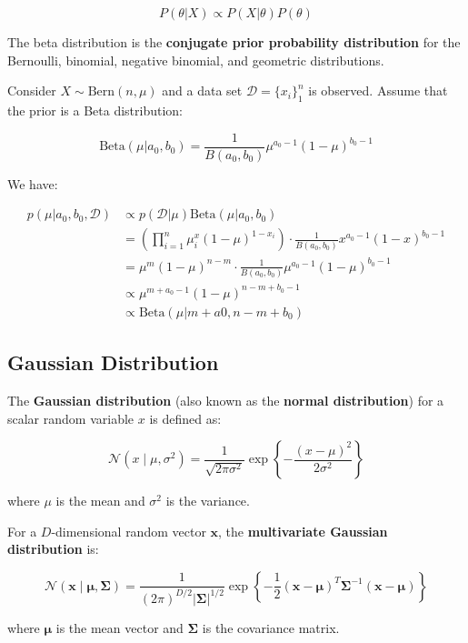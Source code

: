 \[
    P(\theta | X) \propto P(X|\theta)P(\theta)
\]

The beta distribution is the \textbf{conjugate prior probability distribution} for the Bernoulli, binomial, negative binomial, and geometric distributions.

Consider $X \sim \text{Bern}(n, \mu)$ and a data set $\mathcal{D} = \{ x_i \}_1^n$ is observed.
Assume that the prior is a Beta distribution:

\[
    \text{Beta}(\mu | a_0, b_0) = \frac{1}{B(a_0, b_0)} \mu^{a_0 - 1}(1 - \mu)^{b_0 - 1}
\]

We have:

\[
    \begin{align*}
        p(\mu | a_0, b_0, \mathcal{D})
        &\propto p(\mathcal{D} | \mu)\text{Beta}(\mu | a_0, b_0) \\
        &= \left( \prod_{i = 1}^{n}{ \mu_i^x(1-\mu)^{1-x_i} } \right) \cdot \frac{1}{B(a_0, b_0)} x^{a_0 - 1}(1 - x)^{b_0 - 1} \\
        &= \mu^m(1-\mu)^{n - m} \cdot \frac{1}{B(a_0, b_0)} \mu^{a_0 - 1}(1 - \mu)^{b_0 - 1} \\
        &\propto \mu^{m + a_0 - 1}(1 - \mu)^{n - m + b_0 - 1} \\
        &\propto \text{Beta}(\mu | m + a0, n - m + b_0)
    \end{align*}
\]

\subsection{Gaussian Distribution}
\label{subsec:gaussian-distribution}

The \textbf{Gaussian distribution} (also known as the \textbf{normal distribution}) for a scalar random variable $x$ is defined as:

\[
    \mathcal{N}(x \mid \mu, \sigma^2)
    = \frac{1}{\sqrt{2\pi\sigma^2}} \exp\left\{-\frac{(x - \mu)^2}{2\sigma^2}\right\}
\]

where $\mu$ is the mean and $\sigma^2$ is the variance.

For a $D$-dimensional random vector $\mathbf{x}$, the \textbf{multivariate Gaussian distribution} is:

\[
    \mathcal{N}(\mathbf{x} \mid \boldsymbol{\mu}, \boldsymbol{\Sigma})
    = \frac{1}{(2\pi)^{D/2}|\boldsymbol{\Sigma}|^{1/2}} \exp\left\{-\frac{1}{2}(\mathbf{x} - \boldsymbol{\mu})^T\boldsymbol{\Sigma}^{-1}(\mathbf{x} - \boldsymbol{\mu})\right\}
\]

where $\boldsymbol{\mu}$ is the mean vector and $\boldsymbol{\Sigma}$ is the covariance matrix.

